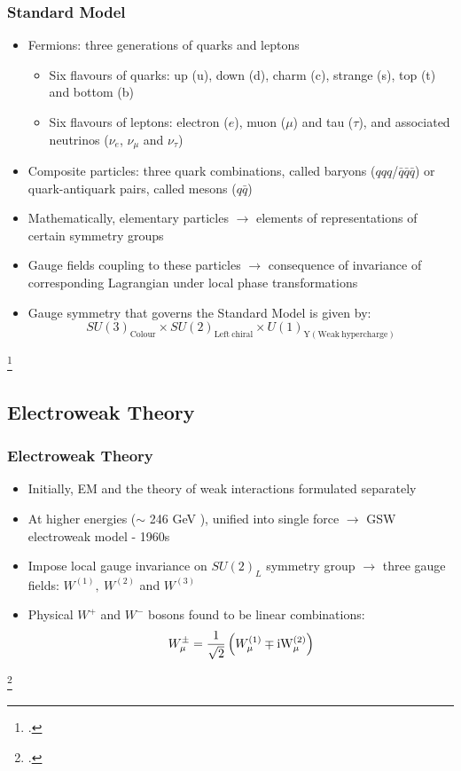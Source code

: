 \documentclass[10pt]{beamer}
\begin{document}
\begin{frame}
\frametitle{Standard Model}
\begin{itemize}
\item Fermions: three generations of quarks and leptons
\begin{itemize}
\item Six flavours of quarks: up (u), down (d), charm (c), strange (s), top (t) and bottom (b)
\item Six flavours of leptons: electron ($e$), muon ($\mu$) and tau ($\tau$), and associated neutrinos ($\nu_{e}$, $\nu_{\mu}$ and $\nu_{\tau}$)
\end{itemize}
\item Composite particles: three quark combinations, called baryons ($qqq$/$\bar{q}\bar{q}\bar{q}$) or quark-antiquark pairs, called  mesons ($q\bar{q}$)
\item Mathematically, elementary particles $\rightarrow$ elements of representations of certain symmetry groups
\item Gauge fields coupling to these particles $\rightarrow$ consequence of invariance of corresponding Lagrangian under local phase transformations \footnotemark{}
\item Gauge symmetry that governs the Standard Model is given by: $$SU(3)_{\mathrm{Colour}}\times SU(2)_{\mathrm{Left\ chiral}}\times U(1)_{\mathrm{Y}(\mathrm{Weak \ hypercharge})}$$
\end{itemize}
\footcitetext{thomson_2013}
\end{frame}

\subsection{Electroweak Theory}
\begin{frame}
\frametitle{Electroweak Theory}
\begin{itemize}
\item Initially, EM and the theory of weak interactions formulated separately
\item At higher energies ($\sim$ 246 GeV \footnotemark{}), unified into single force $\rightarrow$ GSW electroweak model - 1960s
\item Impose local gauge invariance on $SU(2)_{L}$ symmetry group $\rightarrow$ three gauge fields: $W^{(1)},\ W^{(2)}$ and $W^{(3)}$
\item Physical $W^{+}$ and $W^{-}$ bosons found to be linear combinations: 
\begin{equation}
W^{\pm}_{\mu}=\dfrac{1}{\sqrt{2}}\left(W^{(1)}_{\mu}\mp \rm{i}W^{(2)}_{\mu}\right)
\end{equation}
\end{itemize}
\footcitetext{pdg-ew}
\end{frame}
\end{document}
